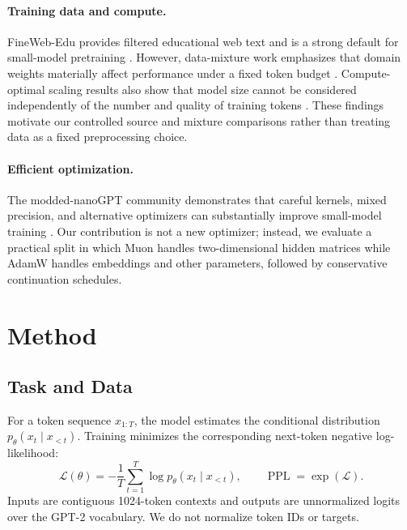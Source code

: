 \documentclass{article}
\newcommand{\ppl}{\operatorname{PPL}}
\begin{document}
\paragraph{Training data and compute.}
FineWeb-Edu provides filtered educational web text and is a strong default for
small-model pretraining \citep{penedo2024fineweb}. However, data-mixture work
emphasizes that domain weights materially affect performance under a fixed
token budget \citep{liu2025datamixture}. Compute-optimal scaling results also
show that model size cannot be considered independently of the number and
quality of training tokens \citep{hoffmann2022chinchilla}. These findings
motivate our controlled source and mixture comparisons rather than treating
data as a fixed preprocessing choice.

\paragraph{Efficient optimization.}
The modded-nanoGPT community demonstrates that careful kernels, mixed
precision, and alternative optimizers can substantially improve small-model
training \citep{jordan2024moddednanogpt}. Our contribution is not a new
optimizer; instead, we evaluate a practical split in which Muon handles
two-dimensional hidden matrices while AdamW handles embeddings and other
parameters, followed by conservative continuation schedules.

\section{Method}
\label{sec:method}

\subsection{Task and Data}

For a token sequence $x_{1:T}$, the model estimates the conditional
distribution $p_\theta(x_t\mid x_{<t})$. Training minimizes the corresponding
next-token negative log-likelihood:
\begin{equation}
  \mathcal{L}(\theta)
  =-\frac{1}{T}\sum_{t=1}^{T}\log p_\theta(x_t\mid x_{<t}),
  \qquad
  \ppl=\exp(\mathcal{L}).
  \label{eq:objective}
\end{equation}
Inputs are contiguous 1024-token contexts and outputs are unnormalized logits
over the GPT-2 vocabulary. We do not normalize token IDs or targets.
\end{document}
